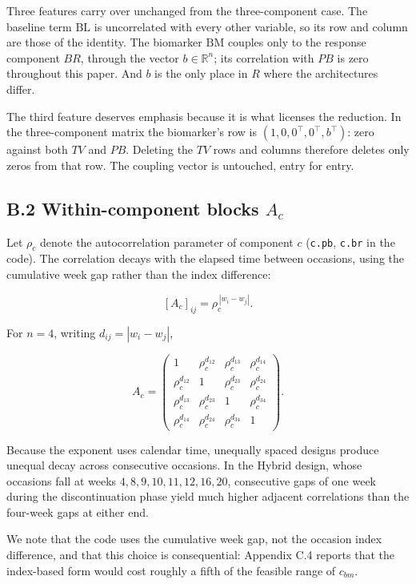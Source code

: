 \documentclass[
  11pt,
]{article}
\begin{document}
Three features carry over unchanged from the three-component case.
The baseline term \(\mathrm{BL}\) is uncorrelated with every other
variable, so its row and column are those of the identity. The
biomarker \(\mathrm{BM}\) couples only to the response component \(BR\),
through the vector \(b \in \mathbb{R}^{n}\); its correlation with \(PB\)
is zero throughout this paper. And \(b\) is the only place in \(R\) where
the architectures differ.

The third feature deserves emphasis because it is what licenses the
reduction. In the three-component matrix the biomarker's row is
\((1, 0, 0^{\top}, 0^{\top}, b^{\top})\): zero against both \(TV\) and
\(PB\). Deleting the \(TV\) rows and columns therefore deletes only
zeros from that row. The coupling vector is untouched, entry for
entry.

\subsection{B.2 Within-component blocks $A_c$}

Let \(\rho_c\) denote the autocorrelation parameter of component \(c\)
(\texttt{c.pb}, \texttt{c.br} in the code). The correlation decays
with the elapsed time between occasions, using the cumulative week
gap rather than the index difference:

\[
[A_c]_{ij} = \rho_c^{\,|w_i - w_j|}.
\]

For \(n = 4\), writing \(d_{ij} = |w_i - w_j|\),

\[
A_c =
\begin{pmatrix}
1 & \rho_c^{d_{12}} & \rho_c^{d_{13}} & \rho_c^{d_{14}}\\
\rho_c^{d_{12}} & 1 & \rho_c^{d_{23}} & \rho_c^{d_{24}}\\
\rho_c^{d_{13}} & \rho_c^{d_{23}} & 1 & \rho_c^{d_{34}}\\
\rho_c^{d_{14}} & \rho_c^{d_{24}} & \rho_c^{d_{34}} & 1
\end{pmatrix}.
\]

Because the exponent uses calendar time, unequally spaced designs
produce unequal decay across consecutive occasions. In the Hybrid
design, whose occasions fall at weeks \(4, 8, 9, 10, 11, 12, 16, 20\),
consecutive gaps of one week during the discontinuation phase yield
much higher adjacent correlations than the four-week gaps at either
end.

We note that the code uses the cumulative week gap, not the occasion
index difference, and that this choice is consequential: Appendix C.4
reports that the index-based form would cost roughly a fifth of the
feasible range of \(c_{bm}\).
\end{document}
